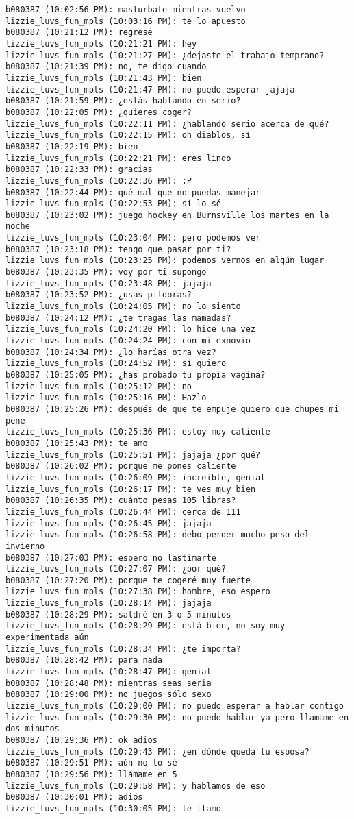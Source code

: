 \begin{verbatim}
b080387 (10:02:56 PM): masturbate mientras vuelvo
lizzie_luvs_fun_mpls (10:03:16 PM): te lo apuesto
b080387 (10:21:12 PM): regresé
lizzie_luvs_fun_mpls (10:21:21 PM): hey 
lizzie_luvs_fun_mpls (10:21:27 PM): ¿dejaste el trabajo temprano?
b080387 (10:21:39 PM): no, te digo cuando
lizzie_luvs_fun_mpls (10:21:43 PM): bien
lizzie_luvs_fun_mpls (10:21:47 PM): no puedo esperar jajaja
b080387 (10:21:59 PM): ¿estás hablando en serio?
b080387 (10:22:05 PM): ¿quieres coger?
lizzie_luvs_fun_mpls (10:22:11 PM): ¿hablando serio acerca de qué?
lizzie_luvs_fun_mpls (10:22:15 PM): oh diablos, sí
b080387 (10:22:19 PM): bien
lizzie_luvs_fun_mpls (10:22:21 PM): eres lindo
b080387 (10:22:33 PM): gracias
lizzie_luvs_fun_mpls (10:22:36 PM): :P
b080387 (10:22:44 PM): qué mal que no puedas manejar
lizzie_luvs_fun_mpls (10:22:53 PM): sí lo sé
b080387 (10:23:02 PM): juego hockey en Burnsville los martes en la noche
lizzie_luvs_fun_mpls (10:23:04 PM): pero podemos ver
b080387 (10:23:18 PM): tengo que pasar por ti?
lizzie_luvs_fun_mpls (10:23:25 PM): podemos vernos en algún lugar
b080387 (10:23:35 PM): voy por ti supongo
lizzie_luvs_fun_mpls (10:23:48 PM): jajaja
b080387 (10:23:52 PM): ¿usas pildoras?
lizzie_luvs_fun_mpls (10:24:05 PM): no lo siento 
b080387 (10:24:12 PM): ¿te tragas las mamadas?
lizzie_luvs_fun_mpls (10:24:20 PM): lo hice una vez
lizzie_luvs_fun_mpls (10:24:24 PM): con mi exnovio
b080387 (10:24:34 PM): ¿lo harías otra vez?
lizzie_luvs_fun_mpls (10:24:52 PM): sí quiero
b080387 (10:25:05 PM): ¿has probado tu propia vagina?
lizzie_luvs_fun_mpls (10:25:12 PM): no
lizzie_luvs_fun_mpls (10:25:16 PM): Hazlo
b080387 (10:25:26 PM): después de que te empuje quiero que chupes mi pene
lizzie_luvs_fun_mpls (10:25:36 PM): estoy muy caliente
b080387 (10:25:43 PM): te amo
lizzie_luvs_fun_mpls (10:25:51 PM): jajaja ¿por qué?
b080387 (10:26:02 PM): porque me pones caliente
lizzie_luvs_fun_mpls (10:26:09 PM): increible, genial
lizzie_luvs_fun_mpls (10:26:17 PM): te ves muy bien
b080387 (10:26:35 PM): cuánto pesas 105 libras?
lizzie_luvs_fun_mpls (10:26:44 PM): cerca de 111
lizzie_luvs_fun_mpls (10:26:45 PM): jajaja
lizzie_luvs_fun_mpls (10:26:58 PM): debo perder mucho peso del invierno
b080387 (10:27:03 PM): espero no lastimarte
lizzie_luvs_fun_mpls (10:27:07 PM): ¿por què?
b080387 (10:27:20 PM): porque te cogeré muy fuerte
lizzie_luvs_fun_mpls (10:27:38 PM): hombre, eso espero
lizzie_luvs_fun_mpls (10:28:14 PM): jajaja
b080387 (10:28:29 PM): saldré en 3 o 5 minutos
lizzie_luvs_fun_mpls (10:28:29 PM): está bien, no soy muy experimentada aún
lizzie_luvs_fun_mpls (10:28:34 PM): ¿te importa?
b080387 (10:28:42 PM): para nada
lizzie_luvs_fun_mpls (10:28:47 PM): genial
b080387 (10:28:48 PM): mientras seas seria
b080387 (10:29:00 PM): no juegos sólo sexo
lizzie_luvs_fun_mpls (10:29:00 PM): no puedo esperar a hablar contigo
lizzie_luvs_fun_mpls (10:29:30 PM): no puedo hablar ya pero llamame en dos minutos
b080387 (10:29:36 PM): ok adios
lizzie_luvs_fun_mpls (10:29:43 PM): ¿en dónde queda tu esposa?
b080387 (10:29:51 PM): aún no lo sé
b080387 (10:29:56 PM): llámame en 5
lizzie_luvs_fun_mpls (10:29:58 PM): y hablamos de eso
b080387 (10:30:01 PM): adiós
lizzie_luvs_fun_mpls (10:30:05 PM): te llamo
\end{verbatim}





